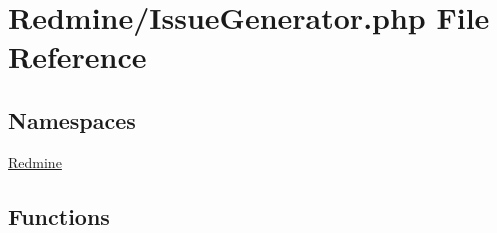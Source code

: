 \hypertarget{_issue_generator_8php}{}\section{Redmine/\+Issue\+Generator.php File Reference}
\label{_issue_generator_8php}
\subsection*{Namespaces}
\begin{DoxyCompactItemize}
\item 
 \mbox{\hyperlink{namespace_redmine}{Redmine}}
\end{DoxyCompactItemize}
\subsection*{Functions}
